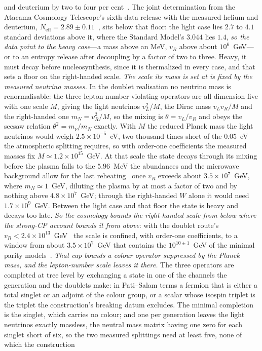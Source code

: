 \documentclass[11pt,a4paper]{article}
\theoremstyle{plain}
\theoremstyle{definition}
\theoremstyle{remark}
\begin{document}
and deuterium by two to four per cent~\cite{JanzenCosmogenesis}. The joint determination from the Atacama Cosmology Telescope's sixth data release with the measured helium and deuterium, $N_{\mathrm{eff}}=2.89\pm0.11$~\cite{ACTDR6ext}, sits below that floor: the light case lies $2.7$ to $4.1$ standard deviations above it, where the Standard Model's $3.044$ lies $1.4$, \emph{so the data point to the heavy case}---a mass above an MeV, $v_R$ above about $10^{6}$~GeV---or to an entropy release after decoupling by a factor of two to three. Heavy, it must decay before nucleosynthesis, since it is thermalized in every case, and that sets a floor on the right-handed scale. \emph{The scale its mass is set at is fixed by the measured neutrino masses.} In the doublet realisation no neutrino mass is renormalisable: the three lepton-number-violating operators are all dimension five with one scale $M$, giving the light neutrinos $v_L^{2}/M$, the Dirac mass $v_Lv_R/M$ and the right-handed one $m_N=v_R^{2}/M$, so the mixing is $\theta=v_L/v_R$ and obeys the seesaw relation $\theta^{2}=m_\nu/m_N$ exactly. With $M$ the reduced Planck mass the light neutrinos would weigh $2.5\times10^{-5}$~eV, two thousand times short of the $0.05$~eV the atmospheric splitting requires, so with order-one coefficients the measured masses fix $M\simeq1.2\times10^{15}$~GeV. At that scale the state decays through its mixing before the plasma falls to the $5.96$~MeV the abundances and the microwave background allow for the last reheating~\cite{Barbieri2025} once $v_R$ exceeds about $3.5\times10^{7}$~GeV, where $m_N\simeq1$~GeV, diluting the plasma by at most a factor of two and by nothing above $4.8\times10^{7}$~GeV; through the right-handed $W$ alone it would need $1.7\times10^{9}$~GeV. Between the light case and that floor the state is heavy and decays too late. \emph{So the cosmology bounds the right-handed scale from below where the strong-CP account bounds it from above}: with the doublet route's $v_R<2.4\times10^{13}$~GeV~\cite{JanzenMatter} the scale is confined, with order-one coefficients, to a window from about $3.5\times10^{7}$~GeV that contains the $10^{10\pm1}$~GeV of the minimal parity models~\cite{HallHarigaya2018}. \emph{That cap bounds a colour operator suppressed by the Planck mass, and the lepton-number scale leaves it there.} The three operators are completed at tree level by exchanging a state in one of the channels the generation and the doublets make: in Pati--Salam terms a fermion that is either a total singlet or an adjoint of the colour group, or a scalar whose isospin triplet is the triplet the construction's breaking datum excludes. The minimal completion is the singlet, which carries no colour; and one per generation leaves the light neutrinos exactly massless, the neutral mass matrix having one zero for each singlet short of six, so the two measured splittings need at least five, none of which the construction 
\end{document}

